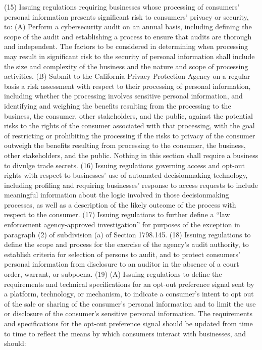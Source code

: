 (15) Issuing regulations requiring businesses whose processing of consumers’ personal information presents significant risk to consumers’ privacy or security, to:
(A) Perform a cybersecurity audit on an annual basis, including defining the scope of the audit and establishing a process to ensure that audits are thorough and independent. The factors to be considered in determining when processing may result in significant risk to the security of personal information shall include the size and complexity of the business and the nature and scope of processing activities.
(B) Submit to the California Privacy Protection Agency on a regular basis a risk assessment with respect to their processing of personal information, including whether the processing involves sensitive personal information, and identifying and weighing the benefits resulting from the processing to the business, the consumer, other stakeholders, and the public, against the potential risks to the rights of the consumer associated with that processing, with the goal of restricting or prohibiting the processing if the risks to privacy of the consumer outweigh the benefits resulting from processing to the consumer, the business, other stakeholders, and the public. Nothing in this section shall require a business to divulge trade secrets.
(16) Issuing regulations governing access and opt-out rights with respect to businesses’ use of automated decisionmaking technology, including profiling and requiring businesses’ response to access requests to include meaningful information about the logic involved in those decisionmaking processes, as well as a description of the likely outcome of the process with respect to the consumer.
(17) Issuing regulations to further define a “law enforcement agency-approved investigation” for purposes of the exception in paragraph (2) of subdivision (a) of Section 1798.145.
(18) Issuing regulations to define the scope and process for the exercise of the agency’s audit authority, to establish criteria for selection of persons to audit, and to protect consumers’ personal information from disclosure to an auditor in the absence of a court order, warrant, or subpoena.
(19) (A) Issuing regulations to define the requirements and technical specifications for an opt-out preference signal sent by a platform, technology, or mechanism, to indicate a consumer’s intent to opt out of the sale or sharing of the consumer’s personal information and to limit the use or disclosure of the consumer’s sensitive personal information. The requirements and specifications for the opt-out preference signal should be updated from time to time to reflect the means by which consumers interact with businesses, and should:
